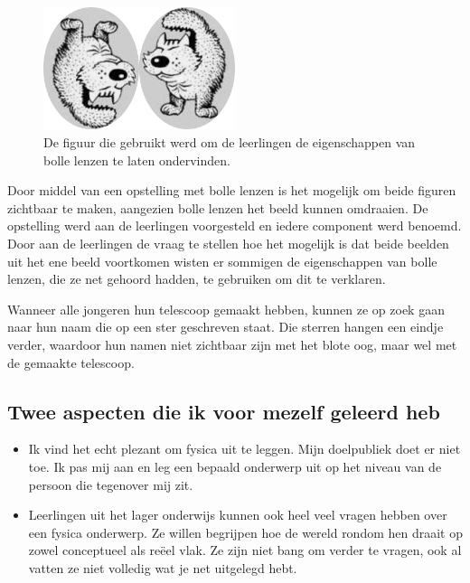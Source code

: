 \documentclass[a4paper,12pt,twoside]{article}%
\begin{document}
	\begin{figure}[!h]
		\centering
		\includegraphics[width=0.5\textwidth]{HondKat}
		\caption{De figuur die gebruikt werd om de  leerlingen de eigenschappen van bolle lenzen te laten ondervinden.}
		\label{Fig::HondKat}
	\end{figure}
	Door middel van een opstelling met bolle lenzen is het mogelijk om beide figuren zichtbaar te maken, aangezien bolle lenzen het beeld kunnen omdraaien. De opstelling werd aan de leerlingen voorgesteld en iedere component werd benoemd. Door aan de  leerlingen de vraag te stellen hoe het mogelijk is dat beide beelden uit het ene beeld voortkomen wisten er sommigen de eigenschappen van bolle lenzen, die ze net gehoord hadden, te gebruiken om dit te verklaren. 
	
	Wanneer alle jongeren hun telescoop gemaakt hebben, kunnen ze op zoek gaan naar hun naam die op een ster geschreven staat. Die sterren hangen een eindje verder, waardoor hun namen niet zichtbaar zijn met het blote oog, maar wel met de gemaakte telescoop. 
	
	\subsection{Twee aspecten die ik voor mezelf geleerd heb}
	\begin{itemize}
		\item Ik vind het echt plezant om fysica uit te leggen. Mijn doelpubliek doet er niet toe. Ik pas mij aan en leg een bepaald onderwerp uit op het niveau van de persoon die tegenover mij zit.
		\item Leerlingen uit het lager onderwijs kunnen ook heel veel vragen hebben over een fysica onderwerp. Ze willen begrijpen hoe de wereld rondom hen draait op zowel conceptueel als reëel vlak. Ze zijn niet bang om verder te vragen, ook al vatten ze niet volledig wat je net uitgelegd hebt.
	\end{itemize}
	
\end{document}
